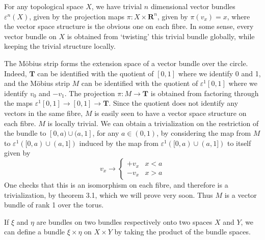\begin{example}
    For any topological space $X$, we have trivial $n$ dimensional vector bundles $\varepsilon^n(X)$, given by the projection maps $\pi: X \times \mathbf{R}^n$, given by $\pi(v_x) = x$, where the vector space structure is the obvious one on each fibre. In some sense, every vector bundle on $X$ is obtained from `twisting' this trivial bundle globally, while keeping the trivial structure locally.
\end{example}

\begin{example}
    The M\"{o}bius strip forms the extension space of a vector bundle over the circle. Indeed, $\mathbf{T}$ can be identified with the quotient of $[0,1]$ where we identify 0 and 1, and the M\"{o}bius strip $M$ can be identified with the quotient of $\varepsilon^1[0,1]$ where we identify $v_0$ and $-v_1$. The projection $\pi: M \to \mathbf{T}$ is obtained from factoring through the maps $\varepsilon^1[0,1] \to [0,1] \to \mathbf{T}$. Since the quotient does not identify any vectors in the same fibre, $M$ is easily seen to have a vector space structure on each fibre. $M$ is locally trivial. We can obtain a trivialization on the restriction of the bundle to $[0,a) \cup (a,1]$, for any $a \in (0,1)$, by considering the map from $M$ to $\varepsilon^1([0,a) \cup (a,1])$ induced by the map from $\varepsilon^1([0,a) \cup (a,1])$ to itself given by
    \[ v_x \to \begin{cases} + v_x & x < a \\ - v_x & x > a \end{cases} \]
    One checks that this is an isomorphism on each fibre, and therefore is a trivialization, by theorem 3.1, which we will prove very soon. Thus $M$ is a vector bundle of rank 1 over the torus.
\end{example}

\begin{example}
    If $\xi$ and $\eta$ are bundles on two bundles respectively onto two spaces $X$ and $Y$, we can define a bundle $\xi \times \eta$ on $X \times Y$ by taking the product of the bundle spaces.
\end{example}

